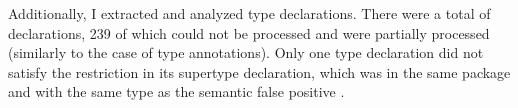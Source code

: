 Additionally, I extracted and analyzed type declarations.
There were a total of  declarations,
239 of which could not be processed and  were partially
processed (similarly to the case of type annotations). 
Only one type declaration did not satisfy the restriction in its supertype
declaration, which was in the same package and with the same type as the
semantic false positive .










